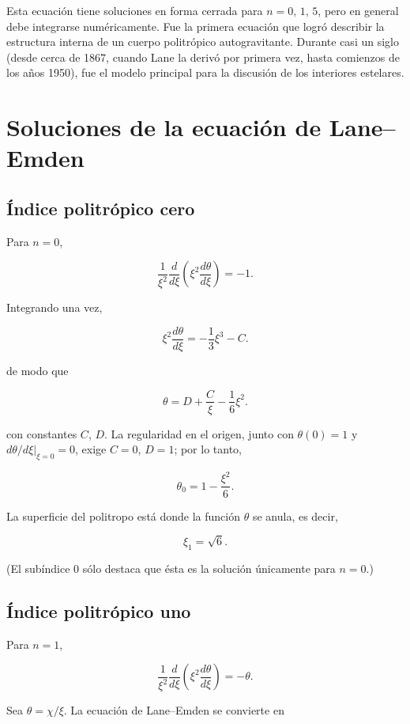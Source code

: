 Esta ecuación tiene soluciones en forma cerrada para $n = 0,\,1,\,5$, pero en general debe integrarse numéricamente. Fue la primera ecuación que logró describir la estructura interna de un cuerpo politrópico autogravitante. Durante casi un siglo (desde cerca de 1867, cuando Lane la derivó por primera vez, hasta comienzos de los años 1950), fue el modelo principal para la discusión de los interiores estelares.

\section{Soluciones de la ecuación de Lane--Emden}

\figuraSolucionesLaneEmden

\subsection{Índice politrópico cero}

Para $n = 0$,

$$ \frac{1}{\xi^2}\frac{d}{d\xi}\left(\xi^2\frac{d\theta}{d\xi}\right) = -1. $$

Integrando una vez,

$$ \xi^2\frac{d\theta}{d\xi} = -\frac{1}{3}\xi^3 - C. $$

de modo que

$$ \theta = D + \frac{C}{\xi} - \frac{1}{6}\xi^2. $$

con constantes $C$, $D$. La regularidad en el origen, junto con $\theta(0) = 1$ y $\left.d\theta/d\xi\right|_{\xi=0} = 0$, exige $C = 0$, $D = 1$; por lo tanto,

$$ \theta_0 = 1 - \frac{\xi^2}{6}. $$

La superficie del politropo está donde la función $\theta$ se anula, es decir,

$$ \xi_1 = \sqrt{6}. $$

(El subíndice $0$ sólo destaca que ésta es la solución únicamente para $n = 0$.)

\subsection{Índice politrópico uno}

Para $n = 1$,

$$ \frac{1}{\xi^2}\frac{d}{d\xi}\left(\xi^2\frac{d\theta}{d\xi}\right) = -\theta. $$

Sea $\theta = \chi/\xi$. La ecuación de Lane--Emden se convierte en

